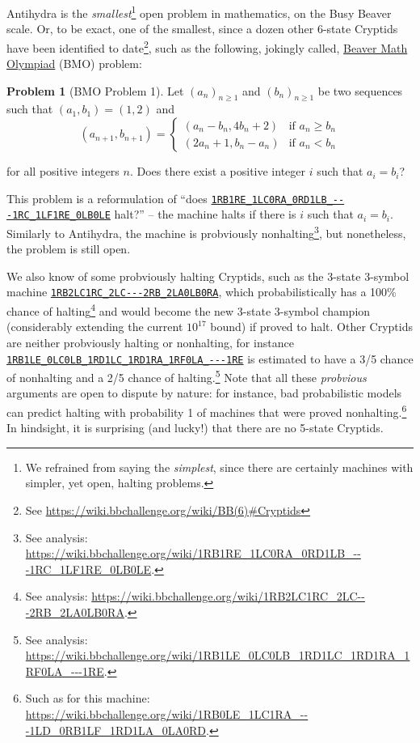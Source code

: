 \documentclass[a4paper,british]{article}
\theoremstyle{definition} %
\newtheorem{problem}{Problem}[section]
\numberwithin{equation}{section}
\theoremstyle{definition} %
\newcommand{\tm}[1]{\href{https://bbchallenge.org/#1}{\texttt{\nolinkurl{#1}}}}
\begin{document}
Antihydra is the \textit{smallest}\footnote{We refrained from saying the \textit{simplest}, since there are certainly machines with simpler, yet open, halting problems.} open problem in mathematics, on the Busy Beaver scale. Or, to be exact, one of the smallest, since a dozen other 6-state Cryptids have been identified to date\footnote{See \url{https://wiki.bbchallenge.org/wiki/BB(6)\#Cryptids}}, such as the following, jokingly called, \href{https://wiki.bbchallenge.org/wiki/Beaver_Math_Olympiad}{Beaver Math Olympiad} (BMO) problem:

\begin{problem}[BMO Problem 1]
Let $(a_n)_{n \ge 1}$ and $(b_n)_{n \ge 1}$ be two sequences such that $(a_1, b_1) = (1, 2)$ and
$$(a_{n+1}, b_{n+1}) = \begin{cases}
        (a_n-b_n, 4b_n+2) & \text{if }a_n \ge b_n \\
        (2a_n+1, b_n-a_n) & \text{if }a_n < b_n
    \end{cases}$$

\noindent for all positive integers $n$. Does there exist a positive integer $i$ such that $a_i = b_i$?
\end{problem}

This problem is a reformulation of  ``does \tm{1RB1RE_1LC0RA_0RD1LB_---1RC_1LF1RE_0LB0LE} halt?'' -- the machine halts if there is $i$ such that $a_i = b_i$. Similarly to Antihydra, the machine is probviously nonhalting\footnote{See analysis: {\scriptsize \url{https://wiki.bbchallenge.org/wiki/1RB1RE_1LC0RA_0RD1LB_---1RC_1LF1RE_0LB0LE}}. }, but nonetheless, the problem is still open.

We also know of some probviously halting Cryptids, such as the 3-state 3-symbol machine \tm{1RB2LC1RC_2LC---2RB_2LA0LB0RA}, which probabilistically  has a 100\% chance of halting\footnote{See analysis: {\scriptsize \url{https://wiki.bbchallenge.org/wiki/1RB2LC1RC_2LC---2RB_2LA0LB0RA}}.} and would become the new 3-state 3-symbol champion (considerably extending the current $10^{17}$ bound) if proved to halt. Other Cryptids are neither probviously halting or nonhalting, for instance \tm{1RB1LE_0LC0LB_1RD1LC_1RD1RA_1RF0LA_---1RE} is estimated to have a 3/5 chance of nonhalting and a 2/5 chance of halting.\footnote{See analysis: {\scriptsize \url{https://wiki.bbchallenge.org/wiki/1RB1LE_0LC0LB_1RD1LC_1RD1RA_1RF0LA_---1RE}}.} Note that all these \textit{probvious} arguments are open to dispute by nature: for instance, bad probabilistic models can predict halting with probability 1 of machines that were proved nonhalting.\footnote{Such as for this machine: \url{https://wiki.bbchallenge.org/wiki/1RB0LE_1LC1RA_---1LD_0RB1LF_1RD1LA_0LA0RD}.} In hindsight, it is surprising (and lucky!) that there are no 5-state Cryptids.
\end{document}
